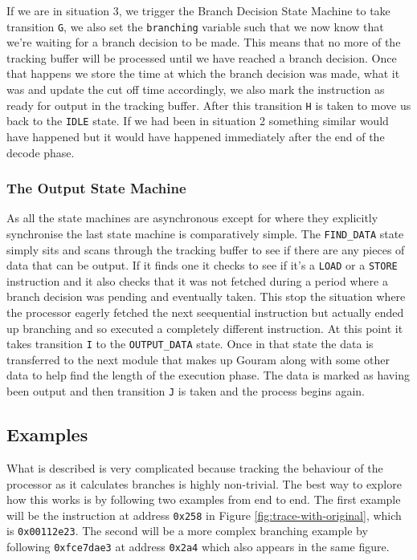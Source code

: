 If we are in situation 3, we trigger the Branch Decision State Machine to take transition \texttt{G}, we also set the \texttt{branching} variable such that we now know that we're waiting for a branch decision to be made. This means that no more of the tracking buffer will be processed until we have reached a branch decision. Once that happens we store the time at which the branch decision was made, what it was and update the cut off time accordingly, we also mark the instruction as ready for output in the tracking buffer. After this transition \texttt{H} is taken to move us back to the \texttt{IDLE} state. If we had been in situation 2 something similar would have happened but it would have happened immediately after the end of the decode phase. 

\subsubsection{The Output State Machine}

As all the state machines are asynchronous except for where they explicitly synchronise the last state machine is comparatively simple. The \texttt{FIND\_DATA} state simply sits and scans through the tracking buffer to see if there are any pieces of data that can be output. If it finds one it checks to see if it's a \texttt{LOAD} or a \texttt{STORE} instruction and it also checks that it was not fetched during a period where a branch decision was pending and eventually taken. This stop the situation where the processor eagerly fetched the next seequential instruction but actually ended up branching and so executed a completely different instruction. At this point it takes transition \texttt{I} to the \texttt{OUTPUT\_DATA} state. Once in that state the data is transferred to the next module that makes up Gouram along with some other data to help find the length of the execution phase. The data is marked as having been output and then transition \texttt{J} is taken and the process begins again.

\subsection{Examples}

What is described is very complicated because tracking the behaviour of the processor as it calculates branches is highly non-trivial. The best way to explore how this works is by following two examples from end to end. The first example will be the instruction at address \texttt{0x258} in Figure \ref{fig:trace-with-original}, which is \texttt{0x00112e23}. The second will be a more complex branching example by following \texttt{0xfce7dae3} at address \texttt{0x2a4} which also appears in the same figure.

